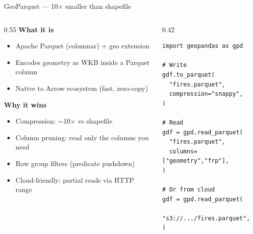 \documentclass[10pt,aspectratio=169]{beamer}
\begin{document}
\begin{frame}[fragile]{GeoParquet — 10$\times$ smaller than shapefile}
  \begin{columns}[T]
    \begin{column}{0.55\textwidth}
      \textbf{What it is}
      \begin{itemize}\itemsep2pt
        \item Apache Parquet (columnar) + geo extension
        \item Encodes geometry as WKB inside a Parquet column
        \item Native to Arrow ecosystem (fast, zero-copy)
      \end{itemize}
      \vspace{0.4em}
      \textbf{Why it wins}
      \begin{itemize}\itemsep2pt
        \item Compression: $\sim$10$\times$ vs shapefile
        \item Column pruning: read only the columns you need
        \item Row group filters (predicate pushdown)
        \item Cloud-friendly: partial reads via HTTP range
      \end{itemize}
    \end{column}
    \begin{column}{0.42\textwidth}
\begin{lstlisting}[style=py]
import geopandas as gpd

# Write
gdf.to_parquet(
  "fires.parquet",
  compression="snappy",
)

# Read
gdf = gpd.read_parquet(
  "fires.parquet",
  columns=["geometry","frp"],
)

# Or from cloud
gdf = gpd.read_parquet(
  "s3://.../fires.parquet",
)
\end{lstlisting}
    \end{column}
  \end{columns}
\end{frame}
\end{document}
